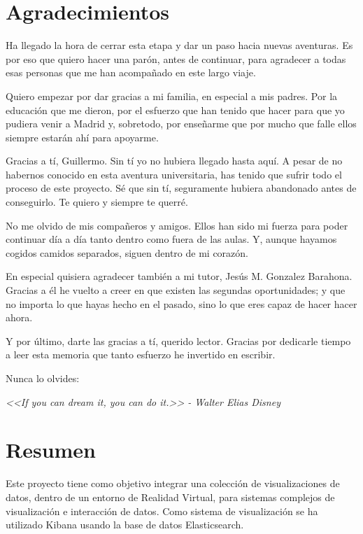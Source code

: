 \documentclass[a4paper, 12pt]{book}
\begin{document}

\chapter*{Agradecimientos}

Ha llegado la hora de cerrar esta etapa y dar un paso hacia nuevas aventuras. Es por eso que quiero hacer una parón, antes de continuar, para agradecer a todas esas personas que me han acompañado en este largo viaje.

Quiero empezar por dar gracias a mi familia, en especial a mis padres. Por la educación que me dieron, por el esfuerzo que han tenido que hacer para que yo pudiera venir a Madrid y, sobretodo, por enseñarme que por mucho que falle ellos siempre estarán ahí para apoyarme.

Gracias a tí, Guillermo. Sin tí yo no hubiera llegado hasta aquí. A pesar de no habernos conocido en esta aventura universitaria, has tenido que sufrir todo el proceso de este proyecto. Sé que sin tí, seguramente hubiera abandonado antes de conseguirlo. Te quiero y siempre te querré.

No me olvido de mis compañeros y amigos. Ellos han sido mi fuerza para poder continuar día a día tanto dentro como fuera de las aulas. Y, aunque hayamos cogidos camidos separados, siguen dentro de mi corazón.

En especial quisiera agradecer también a mi tutor, Jesús M. Gonzalez Barahona. Gracias a él he vuelto a creer en que existen las segundas oportunidades; y que no importa lo que hayas hecho en el pasado, sino lo que eres capaz de hacer hacer ahora.

Y por último, darte las gracias a tí, querido lector. Gracias por dedicarle tiempo a leer esta memoria que tanto esfuerzo he invertido en escribir. 


\vspace{2cm}
Nunca lo olvides:

\textit{<<If you can dream it, you can do it.>> - Walter Elias Disney}

\chapter*{Resumen}

Este proyecto tiene como objetivo integrar una colección de visualizaciones de datos, dentro de un entorno de Realidad Virtual, para sistemas complejos de visualización e interacción de datos. Como sistema de visualización se ha utilizado Kibana usando la base de datos Elasticsearch. 
\end{document}
